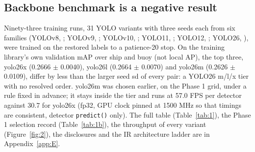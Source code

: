 \documentclass[10pt]{article}
\begin{document}
\subsection{Backbone benchmark is a negative result}\label{sec:6.1}
Ninety-three training runs, 31 YOLO variants with three seeds each from six families (YOLOv8, \citealp{jocher2023ultralytics}; YOLOv9, \citealp{wang2024yolov9}; YOLOv10, \citealp{wang2024yolov10}; YOLO11, \citealp{jocher2024ultralytics}; YOLO12, \citealp{tian2025yolov12}; YOLO26, \citealp{jocher2026ultralytics}), were trained on the restored labels to a patience-20 stop. On the training library's own validation mAP over ship and buoy (not local AP), the top three, yolo26x (0.2666 $\pm$ 0.0040), yolo26l (0.2664 $\pm$ 0.0070) and yolo26m (0.2626 $\pm$ 0.0109), differ by less than the larger seed sd of every pair: a YOLO26 m/l/x tier with no resolved order. yolo26m was chosen earlier, on the Phase 1 grid, under a rule fixed in advance; it stays inside the tier and runs at 57.0 FPS per detector against 30.7 for yolo26x (fp32, GPU clock pinned at 1500 MHz so that timings are consistent, detector \texttt{predict()} only). The full table (Table~\ref{tab:1}), the Phase 1 selection record (Table~\ref{tab:1b}), the throughput of every variant (Figure~\ref{fig:2}), the disclosures and the IR architecture ladder are in Appendix~\ref{app:E}.
\end{document}
